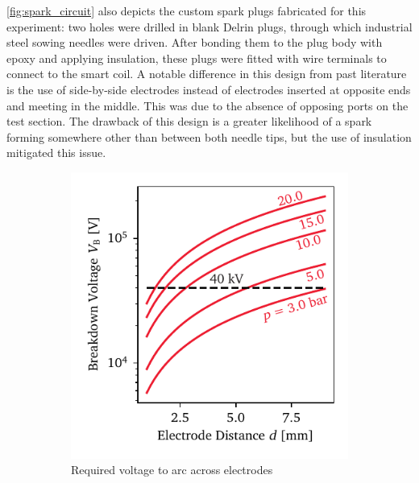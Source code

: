             \autoref{fig:spark_circuit} also depicts the custom spark plugs fabricated for this experiment: two holes were drilled in blank Delrin plugs, through which industrial steel sowing needles were driven. After bonding them to the plug body with epoxy and applying insulation, these plugs were fitted with wire terminals to connect to the smart coil. A notable difference in this design from past literature is the use of side-by-side electrodes instead of electrodes inserted at opposite ends and meeting in the middle. This was due to the absence of opposing ports on the test section. The drawback of this design is a greater likelihood of a spark forming somewhere other than between both needle tips, but the use of insulation mitigated this issue.

            \begin{figure}[h]
                \centering
                \begin{subfigure}[t]{0.47\textwidth}
                    \centering
                    \includegraphics[width=\textwidth]{assets/3 design/pressurePaschen_final.pdf}
                    \caption{Required voltage to arc across electrodes}
                    \label{fig:paschenPressure}
                \end{subfigure}
                \hfill
                \begin{subfigure}[t]{0.47\textwidth}

\end{subfigure}
\end{figure}
